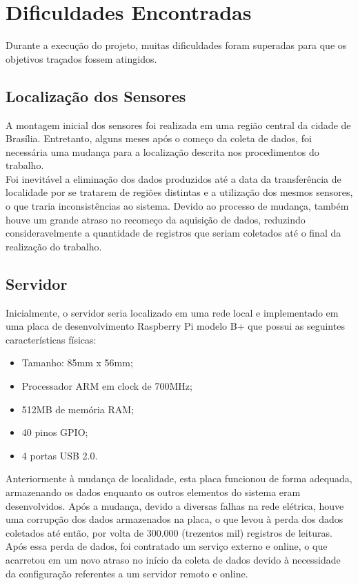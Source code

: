 \section{Dificuldades Encontradas}
\label{sec:dificuldades}
\quad Durante a execução do projeto, muitas dificuldades foram superadas para que os objetivos traçados fossem atingidos.
\subsection{Localização dos Sensores}
\quad A montagem inicial dos sensores foi realizada em uma região central da cidade de Brasília. Entretanto, alguns meses após o começo da coleta de dados, foi necessária uma mudança para a localização descrita nos procedimentos do trabalho.
\\\null \quad Foi inevitável a eliminação dos dados produzidos até a data da transferência de localidade por se tratarem de regiões distintas e a utilização dos mesmos sensores, o que traria inconsistências ao sistema. Devido ao processo de mudança, também houve um grande atraso no recomeço da aquisição de dados, reduzindo consideravelmente a quantidade de registros que seriam coletados até o final da realização do trabalho.

\subsection{Servidor}
\quad Inicialmente, o servidor seria localizado em uma rede local e implementado em uma placa de desenvolvimento Raspberry Pi modelo B+ que possui as seguintes características físicas:
\begin{itemize}
  \item Tamanho: 85mm x 56mm;
  \item Processador ARM em clock de 700MHz;
  \item 512MB de memória RAM;
  \item 40 pinos GPIO;
  \item 4 portas USB 2.0.
\end{itemize}
\null\quad Anteriormente à mudança de localidade, esta placa funcionou de forma adequada, armazenando os dados enquanto os outros elementos do sistema eram desenvolvidos. Após a mudança, devido a diversas falhas na rede elétrica, houve uma corrupção dos dados armazenados na placa, o que levou à perda dos dados coletados até então, por volta de 300.000 (trezentos mil) registros de leituras. Após essa perda de dados, foi contratado um serviço externo e online, o que acarretou em um novo atraso no início da coleta de dados devido à necessidade da configuração referentes a um servidor remoto e online.

